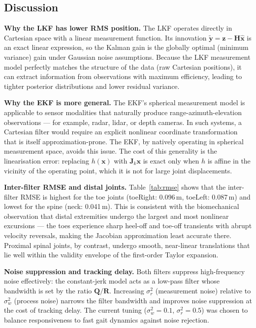 \documentclass[12pt, a4paper]{article}
\begin{document}
\subsection{Discussion}

\textbf{Why the LKF has lower RMS position.}
The LKF operates directly in Cartesian space with a linear measurement function. Its innovation $\tilde{\mathbf{y}} = \mathbf{z} - \mathbf{H}\hat{\mathbf{x}}$ is an exact linear expression, so the Kalman gain is the globally optimal (minimum variance) gain under Gaussian noise assumptions. Because the LKF measurement model perfectly matches the structure of the data (raw Cartesian positions), it can extract information from observations with maximum efficiency, leading to tighter posterior distributions and lower residual variance.

\textbf{Why the EKF is more general.}
The EKF's spherical measurement model is applicable to sensor modalities that naturally produce range-azimuth-elevation observations — for example, radar, lidar, or depth cameras. In such systems, a Cartesian filter would require an explicit nonlinear coordinate transformation that is itself approximation-prone. The EKF, by natively operating in spherical measurement space, avoids this issue. The cost of this generality is the linearisation error: replacing $h(\mathbf{x})$ with $\mathbf{J}_k\mathbf{x}$ is exact only when $h$ is affine in the vicinity of the operating point, which it is not for large joint displacements.

\textbf{Inter-filter RMSE and distal joints.}
Table~\ref{tab:rmse} shows that the inter-filter RMSE is highest for the toe joints (toeRight: 0.096\,m, toeLeft: 0.087\,m) and lowest for the spine (neck: 0.041\,m). This is consistent with the biomechanical observation that distal extremities undergo the largest and most nonlinear excursions — the toes experience sharp heel-off and toe-off transients with abrupt velocity reversals, making the Jacobian approximation least accurate there. Proximal spinal joints, by contrast, undergo smooth, near-linear translations that lie well within the validity envelope of the first-order Taylor expansion.

\textbf{Noise suppression and tracking delay.}
Both filters suppress high-frequency noise effectively: the constant-jerk model acts as a low-pass filter whose bandwidth is set by the ratio $\mathbf{Q}/\mathbf{R}$. Increasing $\sigma_r^2$ (measurement noise) relative to $\sigma_w^2$ (process noise) narrows the filter bandwidth and improves noise suppression at the cost of tracking delay. The current tuning ($\sigma_w^2=0.1$, $\sigma_r^2=0.5$) was chosen to balance responsiveness to fast gait dynamics against noise rejection.
\end{document}
